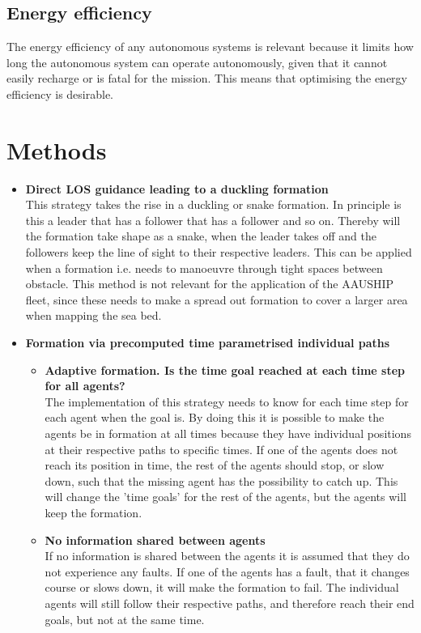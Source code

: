 \subsection{Energy efficiency}
The energy efficiency of any autonomous systems is relevant because it limits how long the autonomous system can operate autonomously, given that it cannot easily recharge or is fatal for the mission. This means that optimising the energy efficiency is desirable.


\section{Methods}
\begin{itemize}
\item \textbf{Direct LOS guidance leading to a duckling formation}\\
This strategy takes the rise in a duckling or snake formation. In principle is this a leader that has a follower that has a follower and so on. Thereby will the formation take shape as a snake, when the leader takes off and the followers keep the line of sight to their respective leaders. This can be applied when a formation i.e. needs to manoeuvre through tight spaces between obstacle. This method is not relevant for the application of the AAUSHIP fleet, since these needs to make a spread out formation to cover a larger area when mapping the sea bed.
\item \textbf{Formation via precomputed time parametrised individual paths}
	\begin{itemize}
	\item \textbf{Adaptive formation. Is the time goal reached at each time step for all agents?}\\
	The implementation of this strategy needs to know for each time step for each agent when the goal is. By doing this it is possible to make the agents be in formation at all times because they have individual positions at their respective paths to specific times. If one of the agents does not reach its position in time, the rest of the agents should stop, or slow down, such that the missing agent has the possibility to catch up. This will change the 'time goals' for the rest of the agents, but the agents will keep the formation.
	\item \textbf{No information shared between agents}\\
	If no information is shared between the agents it is assumed that they do not experience any faults. If one of the agents has a fault, that it changes course or slows down, it will make the formation to fail. The individual agents will still follow their respective paths, and therefore reach their end goals, but not at the same time.

\end{itemize}
\end{itemize}
